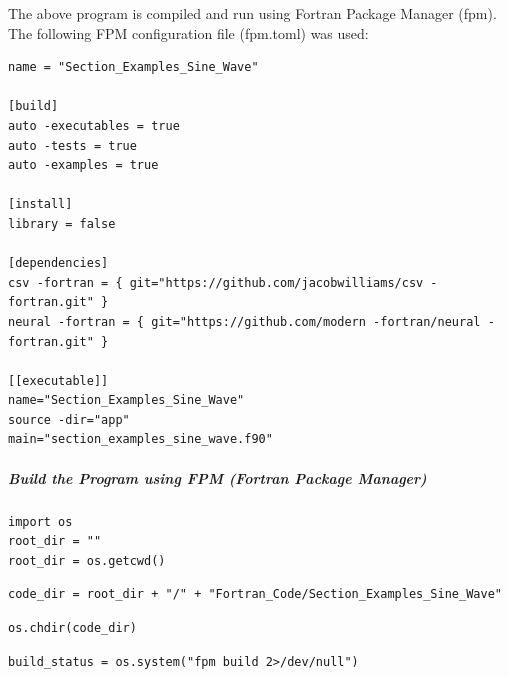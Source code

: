 The above program is compiled and run using Fortran Package Manager (fpm).  The following FPM configuration file (fpm.toml) was used:

\begin{verbatim}
name = "Section_Examples_Sine_Wave"

[build]
auto -executables = true
auto -tests = true
auto -examples = true

[install]
library = false

[dependencies]
csv -fortran = { git="https://github.com/jacobwilliams/csv -fortran.git" }
neural -fortran = { git="https://github.com/modern -fortran/neural -fortran.git" }

[[executable]]
name="Section_Examples_Sine_Wave"
source -dir="app"
main="section_examples_sine_wave.f90"
\end{verbatim}

\subparagraph{Build the Program using FPM (Fortran Package Manager)}

\begin{verbatim}
import os
root_dir = ""
root_dir = os.getcwd()
\end{verbatim}

\begin{verbatim}
code_dir = root_dir + "/" + "Fortran_Code/Section_Examples_Sine_Wave"
\end{verbatim}

\begin{verbatim}
os.chdir(code_dir)
\end{verbatim}

\begin{verbatim}
build_status = os.system("fpm build 2>/dev/null")
\end{verbatim}

